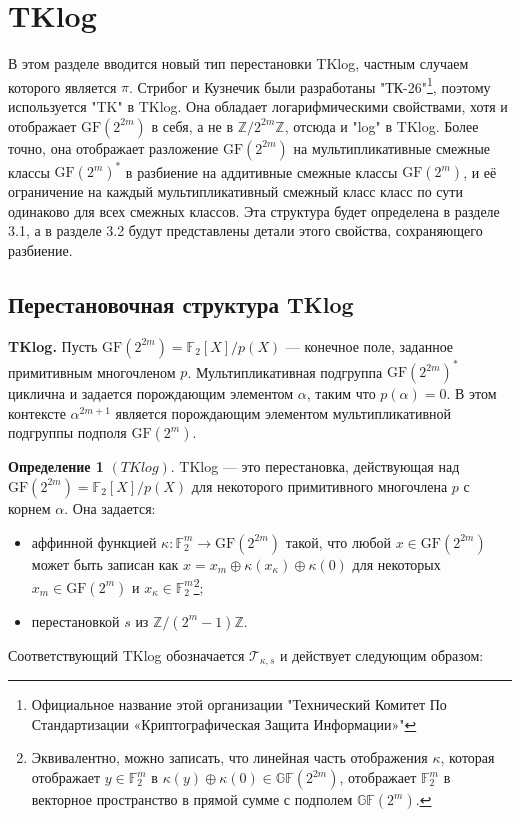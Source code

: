 \section{TKlog}

В этом разделе вводится новый тип перестановки TKlog, частным случаем которого является \(\pi\). Стрибог и Кузнечик были разработаны "ТК-26"\footnote{Официальное название этой организации "Технический Комитет По Стандартизации «Криптографическая Защита Информации»"}, поэтому используется "TK" в TKlog. Она обладает логарифмическими свойствами, хотя и отображает \(\mathrm{GF}(2^{2m})\) в себя, а не в \(\mathbb{Z}/2^{2m}\mathbb{Z}\), отсюда и "log" в TKlog. Более точно, она отображает разложение \(\mathrm{GF}(2^{2m})\) на мультипликативные смежные классы \(\mathrm{GF}(2^m)^*\) в разбиение на аддитивные смежные классы \(\mathrm{GF}(2^m)\), и её ограничение на каждый мультипликативный смежный класс класс по сути одинаково для всех смежных классов. Эта структура будет определена в разделе 3.1, а в разделе 3.2 будут представлены детали этого свойства, сохраняющего разбиение.

\subsection{Перестановочная структура TKlog}

\textbf{TKlog.} Пусть \(\mathrm{GF}(2^{2m}) = \mathbb{F}_2[X]/p(X)\) — конечное поле, заданное примитивным многочленом \(p\). Мультипликативная подгруппа \(\mathrm{GF}(2^{2m})^*\) циклична и задается порождающим элементом \(\alpha\), таким что \(p(\alpha) = 0\). В этом контексте \(\alpha^{2m+1}\) является порождающим элементом мультипликативной подгруппы подполя \(\mathrm{GF}(2^m)\).

\textbf{Определение 1} \((TKlog)\). TKlog — это перестановка, действующая над \(\mathrm{GF}(2^{2m}) = \mathbb{F}_2[X]/p(X)\) для некоторого примитивного многочлена \(p\) с корнем \(\alpha\). Она задается:
\begin{itemize}
    \item аффинной функцией \(\kappa : \mathbb{F}^m_2 \to \mathrm{GF}(2^{2m})\) такой, что любой \(x \in \mathrm{GF}(2^{2m})\) может быть записан как \(x = x_m \oplus \kappa(x_\kappa) \oplus \kappa(0)\) для некоторых \(x_m \in \mathrm{GF}(2^m)\) и \(x_\kappa \in \mathbb{F}^m_2\)\footnote{Эквивалентно, можно записать, что линейная часть отображения \(\kappa\), которая отображает \(y \in \mathbb{F}_2^m\) в \(\kappa(y) \oplus \kappa(0) \in \mathbb{GF}(2^{2m})\), отображает \(\mathbb{F}_2^m\) в векторное пространство в прямой сумме с подполем \(\mathbb{GF}(2^m)\).};
    \item перестановкой \(s\) из \(\mathbb{Z}/(2^m - 1)\mathbb{Z}\).
\end{itemize}
Соответствующий TKlog обозначается \(\mathscr{T}_{\kappa,s}\) и действует следующим образом:

